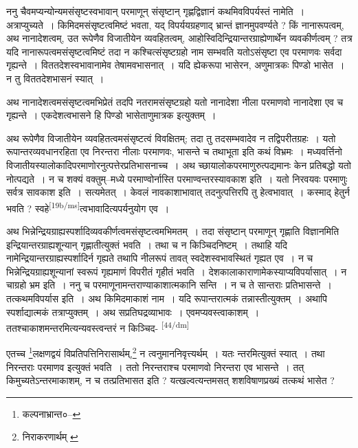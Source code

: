 \documentclass[article,12pt,a4paper]{memoir}
\begin{document}
	  \pstart ननु चैवमप्यन्योन्यमसंसृष्टस्वभावान् परमाणून् संसृष्टान् गृह्णद्विज्ञानं कथमिवविपर्यस्तं नामेति । अत्राप्युच्यते । किमिदमसंसृष्टत्वमिष्टं भवता, यद् विपर्ययग्रहणाद् भ्रान्तं ज्ञानमुपवर्ण्यते ? किं नानारूपत्वम्, अथ नानादेशत्वम्, उत रूपेणैव विजातीयेन व्यवहितत्वम्, आहोस्विदिन्द्रियान्तरग्राह्येणार्थेन व्यवकीर्णत्वम् ? तत्र यदि नानारूपत्वमसंसृष्टत्वमिष्टं तदा न कश्चित्संसृष्टग्रहो नाम सम्भवति यतोऽसंसृष्टा एव परमाणवः सर्वदा गृह्यन्ते । विततदेशस्वभावानामेव तेषामवभासनात् । यदि ह्येकरूपा भासेरन, अणुमात्रकः पिण्डो भासेत । न तु विततदेशभासनं स्यात् ।
	\pend
      

	  \pstart अथ नानादेशत्वमसंसृष्टत्वमभिप्रेतं तदपि नतरामसंसृष्टग्रहो यतो नानादेशा नीला परमाणवो नानादेशा एव च गृह्यन्ते । एकदेशत्वभासने हि पिण्डो भासेताणुमात्रक इत्युक्तम् ।
	\pend
      

	  \pstart अथ रूपेणैव विजातीयेन व्यवहितत्वमसंसृष्टत्वं विवक्षितम्; तदा तु तदसम्भवादेव न तद्विपरीतग्रहः । यतो रूपान्तरव्यवधानरहिता एव निरन्तरा नीलाः परमाणवः, भासन्ते च तथाभूता इति कथं विभ्रमः । मध्यवर्त्तिनो विजातीयस्यालोकादिपरमाणोरनुत्पत्तेरप्रतिभासनाच्च । अथ च्छायालोकपरमाणुरुत्पद्यमानः केन प्रतिबद्धो यतो नोत्पद्यते । न च शक्यं वक्तुम्--मध्ये परमाण्वोर्नास्ति परमाण्वन्तरस्यावकाश इति । यतो निरवयवः परमाणुः सर्वत्र सावकाश इति । सत्यमेतत् । केवलं नावकाशाभावात् तदनुत्पत्तिरपि तु हेत्वभावात् । कस्माद् हेतुर्न भवति ? स्वहे\leavevmode\textsuperscript{\rmlatinfont\tiny [19b/ms]}त्वभावादित्यपर्यनुयोग एव ।
	\pend
      

	  \pstart अथ भिन्नेन्द्रियग्राह्यस्पर्शादिव्यवकीर्णत्वमसंसृष्टत्वमभिमतम् । तदा संसृष्टान् परमाणून् गृह्णाति विज्ञानमिति इन्द्रियान्तरग्राह्यशून्यान् गृह्णातीत्युक्तं भवति । तथा च न किञ्चिदनिष्टम् । तथाहि यदि नामेन्द्रियान्तरग्राह्यस्पर्शादिर्न गृह्यते तथापि नीलरूपं तावत् स्वदेशस्वभावस्थितं गृह्यत एव । न च भिन्नेन्द्रियग्राह्यशून्यानां स्वरूपं गृह्यमाणं विपरीतं गृहीतं भवति । देशकालाकाराणामेकस्याप्यविपर्यासात् । न चाग्रहो भ्रम इति । ननु च परमाणूनामन्तराण्याकाशात्मकानि सन्ति । न च ते सान्तराः प्रतिभासन्ते । तत्कथमविपर्यास इति । अथ किमिदमाकाशं नाम । यदि रूपान्तरात्मकं तन्नास्तीत्युक्तम् । अथापि स्पर्शाद्यात्मकं तत्राप्युक्तम् । अथ सप्रतिघद्रव्याभावः । एवमप्यवस्त्वाकाशम् । ततश्चाकाशमन्तरमित्यन्यवस्त्वन्तरं न किञ्चिद- \leavevmode\textsuperscript{\rmlatinfont\tiny [44/dm]} 
	  
	एतच्च \footnote{कल्पनाभ्रान्त०--\cite{dp-msD-n}}लक्षणद्वयं विप्रतिपत्तिनिरासार्थम्,\footnote{निराकरणार्थम् \cite{dp-msA} \cite{dp-msC} \cite{dp-edP} \cite{dp-edE} \cite{dp-edH} \cite{dp-edN}} न त्वनुमाननिवृत्त्यर्थम् । यतः न्तरमित्युक्तं स्यात् । तथा निरन्तराः परमाणव इत्युक्तं भवति । ततो निरन्तराश्च परमाणवो निरन्तरा एव भासन्ते । तत् किमुच्यतेऽन्तरमाकाशम्, न च तत्प्रतिभासत इति ? यत्खल्वत्यन्तमसत् शशविषाणप्रख्यं तत्कथं भासेत ?
	\pend
      
\end{document}
